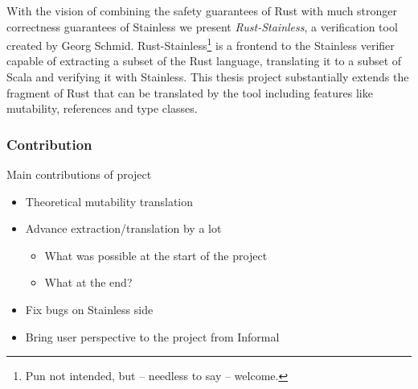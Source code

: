 With the vision of combining the safety guarantees of Rust with much stronger
correctness guarantees of Stainless we present \emph{Rust-Stainless}, a
verification tool created by Georg Schmid. Rust-Stainless\footnote{Pun not
intended, but -- needless to say -- welcome.} is a frontend to the Stainless
verifier capable of extracting a subset of the Rust language, translating it to
a subset of Scala and verifying it with Stainless. This thesis project
substantially extends the fragment of Rust that can be translated by the tool
including features like mutability, references and type classes.

\subsubsection{Contribution}


Main contributions of project
\begin{itemize}
\tightlist
\item
  Theoretical mutability translation
\item
  Advance extraction/translation by a lot

  \begin{itemize}
  \tightlist
  \item
    What was possible at the start of the project
  \item
    What at the end?
  \end{itemize}
\item
  Fix bugs on Stainless side
\item
  Bring user perspective to the project from Informal
\end{itemize}
